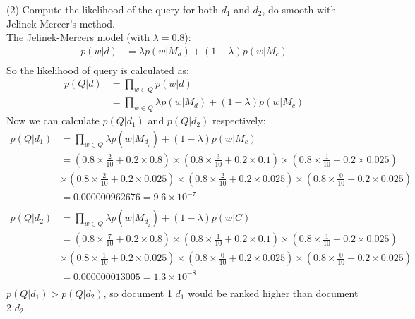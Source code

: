 \documentclass[12pt, letterpaper, twoside]{article}
\begin{document}
\begin{enumerate}
        (2) Compute the likelihood of the query for both $d_1$ and $d_2$, do smooth with Jelinek-Mercer's method.\\
        The Jelinek-Mercers model (with $\lambda = 0.8$):
        \begin{equation}
        \begin{split}
            p(w|d) & = \lambda p(w|M_d) + (1-\lambda)p(w|M_c)\\
        \end{split}
        \end{equation}
        So the likelihood of query is calculated as:
        \begin{equation}
        \begin{split}
            p(Q|d) & = \prod_{w \in Q}^{} p(w|d)\\
            & = \prod_{w \in Q}^{} \lambda p(w|M_d) + (1-\lambda)p(w|M_c)
        \end{split}
        \end{equation}
        Now we can calculate $p(Q|d_1)$ and $p(Q|d_2)$ respectively:\\
        \begin{equation}
        \begin{split}
            p(Q|d_1) & = \prod_{w \in Q}^{} \lambda p(w|M_d__1) + (1-\lambda)p(w|M_c)\\
            & = (0.8\times \frac{2}{10}+0.2\times 0.8)\times (0.8\times \frac{3}{10}+0.2\times 0.1)\times (0.8\times \frac{1}{10}+0.2\times 0.025)\\
            &\times (0.8\times \frac{2}{10}+0.2\times 0.025)\times (0.8\times \frac{2}{10}+0.2\times 0.025)\times (0.8\times \frac{0}{10}+0.2\times 0.025)\\
            & = 0.000000962676 = 9.6\times10^{-7}\\
        \end{split}
        \end{equation}
        \begin{equation}
        \begin{split}
            p(Q|d_2) & = \prod_{w \in Q}^{} \lambda p(w|M_d__2) + (1-\lambda)p(w|C)\\
            & = (0.8\times \frac{7}{10}+0.2\times 0.8)\times (0.8\times \frac{1}{10}+0.2\times 0.1)\times (0.8\times \frac{1}{10}+0.2\times 0.025)\\
            &\times (0.8\times \frac{1}{10}+0.2\times 0.025)\times (0.8\times \frac{0}{10}+0.2\times 0.025)\times (0.8\times \frac{0}{10}+0.2\times 0.025)\\
            & = 0.000000013005 = 1.3\times10^{-8}\\
        \end{split}
        \end{equation}
        $p(Q|d_1) > p(Q|d_2)$, so document 1 $d_1$ would be ranked higher than document 2 $d_2$.\\
\end{enumerate}
\end{document}
